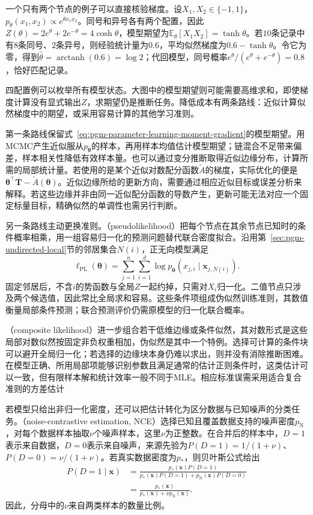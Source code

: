 一个只有两个节点的例子可以直接核验梯度。设$X_1,X_2\in\{-1,1\}$，$p_\theta(x_1,x_2)\propto e^{\theta x_1x_2}$。同号和异号各有两个配置，因此$Z(\theta)=2e^\theta+2e^{-\theta}=4\cosh\theta$，模型期望为$\mathbb{E}_\theta[X_1X_2]=\tanh\theta$。若$10$条记录中有$8$条同号、$2$条异号，则经验统计量为$0.6$，平均似然梯度为$0.6-\tanh\theta$。令它为零，得到$\widehat\theta=\operatorname{arctanh}(0.6)=\log2$；代回模型，同号概率$e^\theta/(e^\theta+e^{-\theta})=0.8$，恰好匹配记录。

四配置例可以枚举所有模型状态。大图中的模型期望则可能需要高维求和，即使梯度计算没有显式输出$Z$，求期望仍是推断任务。降低成本有两条路线：近似计算似然梯度中的期望，或采用容易计算的其他学习准则。

第一条路线保留式~\eqref{eq:pgm-parameter-learning-moment-gradient}的模型期望。用MCMC产生近似服从$p_{\bm{\theta}}$的样本，再用样本均值估计模型期望；链混合不足带来偏差，样本相关性降低有效样本量。也可以通过变分推断取得近似边缘分布，计算所需的局部统计量。若使用的是某个近似对数配分函数$\widetilde A$的梯度，实际优化的便是$\bm{\theta}^\top\overline{\bm{T}}-\widetilde A(\bm{\theta})$。近似边缘所给的更新方向，需要通过相应近似目标或误差分析来解释。若这些边缘并非由同一近似配分函数的导数产生，更新可能无法对应一个固定标量目标，精确似然的单调性也需另行判断。

另一条路线主动更换准则。（pseudolikelihood）把每个节点在其余节点已知时的条件概率相乘，用一组容易归一化的预测问题替代联合密度拟合。沿用第~\ref{sec:pgm-undirected-local}节的邻居集合$N(i)$，正无向模型满足
\begin{equation}
  \ell_{\mathrm{PL}}(\bm{\theta})
  =\sum_{j=1}^n\sum_{i=1}^d
    \log p_{\bm{\theta}}
      (x_{j,i}\mid\bm{x}_{j,N(i)}).
  \label{eq:pgm-parameter-learning-pseudolikelihood}
\end{equation}
固定邻居后，不含$i$的势函数与全局$Z$一起约掉，只需对$X_i$归一化。二值节点只涉及两个候选值，因此常比全局求和容易。这些条件项组成伪似然训练准则，其数值衡量局部条件预测；联合预测评价仍需原模型的归一化联合概率。

（composite likelihood）进一步组合若干低维边缘或条件似然，其对数形式是这些局部对数似然按固定非负权重相加，伪似然是其中一个特例。选择可计算的条件块可以避开全局归一化；若选择的边缘块本身仍难以求出，则并没有消除推断困难。在模型正确、所用局部项能够识别参数且满足通常的估计正则条件时，这类估计可以一致，但有限样本解和统计效率一般不同于MLE。相应标准误需采用适合复合准则的方差估计

若模型只给出非归一化密度，还可以把估计转化为区分数据与已知噪声的分类任务。（noise-contrastive estimation, NCE）选择已知且覆盖数据支持的噪声密度$p_{\mathrm{N}}$，对每个数据样本抽取$\nu$个噪声样本，这里$\nu$为正整数。在合并后的样本中，$D=1$表示来自数据，$D=0$表示来自噪声，来源先验为$P(D=1)=1/(1+\nu)$、$P(D=0)=\nu/(1+\nu)$。若真实数据密度为$p_*$，则贝叶斯公式给出
\[
  \begin{aligned}
    P(D=1\mid\bm{x})
      &=\frac{p_*(\bm{x})P(D=1)}
        {p_*(\bm{x})P(D=1)+p_{\mathrm{N}}(\bm{x})P(D=0)}\\
      &=\frac{p_*(\bm{x})}
        {p_*(\bm{x})+\nu p_{\mathrm{N}}(\bm{x})}.
  \end{aligned}
\]
因此，分母中的$\nu$来自两类样本的数量比例。

